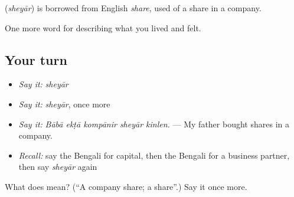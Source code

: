 \begin{cousinweb}
\textbf{} (\emph{sheyār}) is borrowed from English \emph{share}, used of a share in a company.
\end{cousinweb}

\begin{grammarlens}[title={What you've built}]
One more word for describing what you lived and felt.
\end{grammarlens}

\subsection*{Your turn}
\begin{itemize}
\raggedright
  \item \emph{Say it:} \emph{sheyār}
  \item \emph{Say it:} \emph{sheyār}, once more
  \item \emph{Say it:} \emph{Bābā ekṭā kompānir sheyār kinlen.} — My father bought shares in a company.
  \item \emph{Recall:} say the Bengali for capital, then the Bengali for a business partner, then say \emph{sheyār} again
\end{itemize}

\begin{tcolorbox}[breakable,colback=teal!4,colframe=teal!35!black,title={Before you move on}]
What does  mean? (\textquotedblleft{}A company share; a share\textquotedblright{}.) Say it once more.
\end{tcolorbox}
